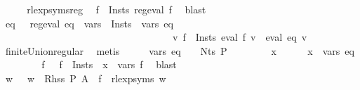 \begin{isabellebody}
\ \ \isamarkupfalse%
\ \isamarkupfalse%
\ rlexp{\isacharunderscore}{\kern0pt}syms{\isacharunderscore}{\kern0pt}reg\ \isamarkupfalse%
\ {\isachardoublequoteopen}{\isasymforall}f\ {\isasymin}\ {\isacharquery}{\kern0pt}Insts{\isachardot}{\kern0pt}\ reg{\isacharunderscore}{\kern0pt}eval\ f{\isachardoublequoteclose}\ \isamarkupfalse%
\ blast\isanewline
\ \ \isamarkupfalse%
\ \isamarkupfalse%
\ eq\ \ {\isacharasterisk}{\kern0pt}{\isacharcolon}{\kern0pt}\ {\isachardoublequoteopen}reg{\isacharunderscore}{\kern0pt}eval\ eq\ {\isasymand}\ {\isasymUnion}{\isacharparenleft}{\kern0pt}vars\ {\isacharbackquote}{\kern0pt}\ {\isacharquery}{\kern0pt}Insts{\isacharparenright}{\kern0pt}\ {\isacharequal}{\kern0pt}\ vars\ eq\isanewline
\ \ \ \ \ \ \ \ \ \ \ \ \ \ \ \ \ \ \ \ \ \ \ \ \ \ \ \ \ \ \ \ \ \ {\isasymand}\ {\isacharparenleft}{\kern0pt}{\isasymforall}v{\isachardot}{\kern0pt}\ {\isacharparenleft}{\kern0pt}{\isasymUnion}f\ {\isasymin}\ {\isacharquery}{\kern0pt}Insts{\isachardot}{\kern0pt}\ eval\ f\ v{\isacharparenright}{\kern0pt}\ {\isacharequal}{\kern0pt}\ eval\ eq\ v{\isacharparenright}{\kern0pt}{\isachardoublequoteclose}\isanewline
\ \ \ \ \isamarkupfalse%
\ finite{\isacharunderscore}{\kern0pt}Union{\isacharunderscore}{\kern0pt}regular\ \isamarkupfalse%
\ metis\isanewline
\ \ \isamarkupfalse%
\ \isamarkupfalse%
\ {\isachardoublequoteopen}vars\ eq\ {\isasymsubseteq}\ {\isasymgamma}{\isacharprime}{\kern0pt}\ {\isacharbackquote}{\kern0pt}\ Nts\ P{\isachardoublequoteclose}\isanewline
\ \ \isamarkupfalse%
\isanewline
\ \ \ \ \isamarkupfalse%
\ x\isanewline
\ \ \ \ \isamarkupfalse%
\ {\isachardoublequoteopen}x\ {\isasymin}\ vars\ eq{\isachardoublequoteclose}\isanewline
\ \ \ \ \isamarkupfalse%
\ {\isacharasterisk}{\kern0pt}\ \isamarkupfalse%
\ f\ \ {\isacharasterisk}{\kern0pt}{\isacharasterisk}{\kern0pt}{\isacharcolon}{\kern0pt}\ {\isachardoublequoteopen}f\ {\isasymin}\ {\isacharquery}{\kern0pt}Insts\ {\isasymand}\ x\ {\isasymin}\ vars\ f{\isachardoublequoteclose}\ \isamarkupfalse%
\ blast\isanewline
\ \ \ \ \isamarkupfalse%
\ \isamarkupfalse%
\ w\ \ {\isacharasterisk}{\kern0pt}{\isacharasterisk}{\kern0pt}{\isacharasterisk}{\kern0pt}{\isacharcolon}{\kern0pt}\ {\isachardoublequoteopen}w\ {\isasymin}\ Rhss\ P\ A\ {\isasymand}\ f\ {\isacharequal}{\kern0pt}\ rlexp{\isacharunderscore}{\kern0pt}syms\ w{\isachardoublequoteclose}\ \isamarkupfalse%

\end{isabellebody}
